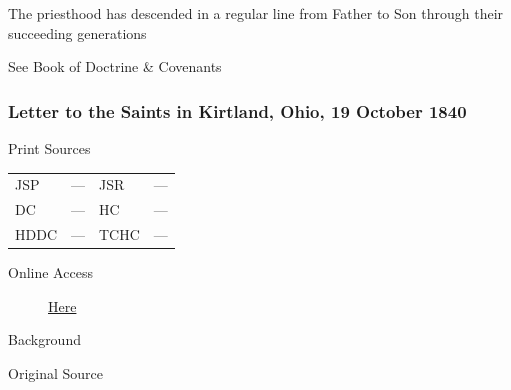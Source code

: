 				The priesthood has descended in a regular line from Father to Son through their succeeding generations

				See Book of Doctrine \& Covenants
				
		\subsubsection{Letter to the Saints in Kirtland, Ohio, 19 October 1840}
			\label{EMS-1840-JS-19-OCT-1840}
			
			\begin{description}
				\item[Print Sources]
			\end{description}

			\begin{tabular}{p{0.5in}p{1in}p{0.5in}p{1in}}
				JSP	 	& ---		& JSR 		& --- \\
				DC	 	& ---		& HC 		& --- \\
				HDDC 	& ---		& TCHC 		& --- \\
			\end{tabular}
			
			\begin{description}
				\item[Online Access] \href{https://www.josephsmithpapers.org/paper-summary/letter-to-the-saints-in-kirtland-ohio-19-october-1840/1}{Here}
			\end{description}
			
			\begin{description}
				\item[Background]
			\end{description}
			
			
			\begin{description}
				\item[Original Source]
			\end{description}
			
			
